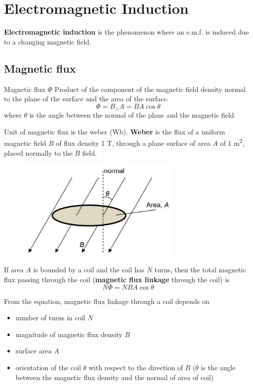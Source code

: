 \section{Electromagnetic Induction}
\textbf{Electromagnetic induction} is the phenomenon where an e.m.f. is induced due to a changing magnetic field.

\subsection{Magnetic flux}
\begin{defn}{Magnetic flux $\Phi$}{}
Product of the component of the magnetic field density normal to the plane of the surface and the area of the
surface.
\begin{equation}
\Phi = B_{\perp}A = BA\cos\theta
\end{equation}
where $\theta$ is the angle between the normal of the plane and the magnetic field.
\end{defn}

Unit of magnetic flux is the weber (Wb). \textbf{Weber} is the flux of a uniform magnetic field $B$ of flux density 1 \unit{T}, through a plane surface of area $A$ of 1 \unit{m^2}, placed normally to the $B$ field.

\begin{figure}[H]
    \centering
    \includegraphics[width=8cm]{images/magnetic_flux.jpg}
\end{figure}

If area $A$ is bounded by a coil and the coil has $N$ turns, then the total magnetic flux passing through the coil (\textbf{magnetic flux linkage} through the coil) is
\begin{equation}
N\Phi = NBA\cos\theta
\end{equation}

From the equation, magnetic flux linkage through a coil depends on
\begin{itemize}
\item number of turns in coil $N$
\item magnitude of magnetic flux density $B$
\item surface area $A$
\item orientation of the coil $\theta$ with respect to the direction of $B$ ($\theta$ is the angle between the magnetic flux density and the normal of area of coil)
\end{itemize}

